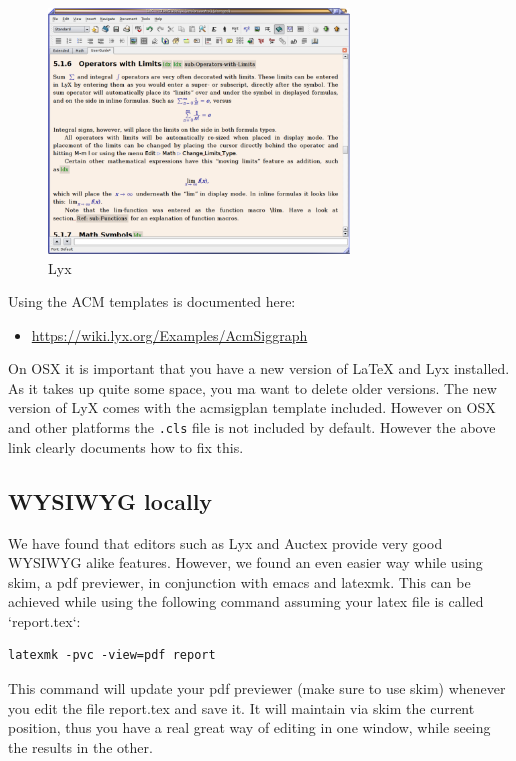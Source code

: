 \begin{figure}[!htb]
  \centering\includegraphics[width=8cm]{images/lyx.png}
  \caption{Lyx}\label{F:lyx}
\end{figure}

Using the ACM templates is documented here:

\begin{itemize}

\item
  \url{https://wiki.lyx.org/Examples/AcmSiggraph}
\end{itemize}

On OSX it is important that you have a new version of LaTeX and Lyx
installed. As it takes up quite some space, you ma want to delete older
versions. The new version of LyX comes with the acmsigplan template
included. However on OSX and other platforms the \verb|.cls| file is not
included by default. However the above link clearly documents how to fix
this.

\subsection{WYSIWYG locally}\label{wysiwyg-locally}

We have found that editors such as Lyx and Auctex provide very good
WYSIWYG alike features. However, we found an even easier way while using
skim, a pdf previewer, in conjunction with emacs and latexmk. This can
be achieved while using the following command assuming your latex file
is called `report.tex`:

\begin{verbatim}
latexmk -pvc -view=pdf report
\end{verbatim}

This command will update your pdf previewer (make sure to use skim)
whenever you edit the file report.tex and save it. It will maintain via
skim the current position, thus you have a real great way of editing in
one window, while seeing the results in the other.

